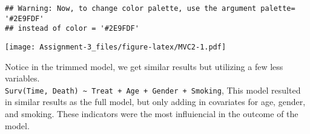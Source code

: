 \documentclass[
]{article}
\begin{document}
\begin{verbatim}
## Warning: Now, to change color palette, use the argument palette= '#2E9FDF'
## instead of color = '#2E9FDF'
\end{verbatim}

\texttt{[image: Assignment-3\_files/figure-latex/MVC2-1.pdf]}

Notice in the trimmed model, we get similar results but utilizing a few
less variables.\\
\texttt{Surv(Time,\ Death)\ \textasciitilde{}\ Treat\ +\ Age\ +\ Gender\ +\ Smoking},
This model resulted in similar results as the full model, but only
adding in covariates for age, gender, and smoking. These indicators were
the most influiencial in the outcome of the model.
\end{document}
